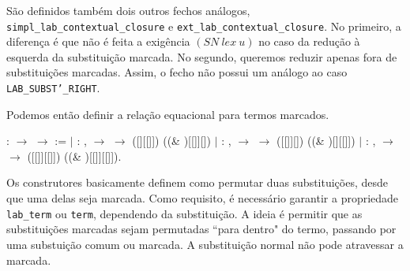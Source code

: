 \bigskip

São definidos também dois outros fechos análogos,
\texttt{simpl\_lab\_contextual\_closure} e
\texttt{ext\_lab\_contextual\_closure}. No primeiro, a diferença é que não é
feita a exigência $(SN\ lex\ u)$ no caso da redução à esquerda da
substituição marcada. No segundo, queremos reduzir apenas fora de substituições
marcadas. Assim, o fecho não possui um análogo ao caso
\texttt{LAB\_SUBST'\_RIGHT}.

\smallskip

Podemos então definir a relação equacional para termos marcados.

\coqdocnoindent {}   : 
\ensuremath{\rightarrow}  \ensuremath{\rightarrow}
 := \coqdoceol \coqdocnoindent 
\coqdocindent{1.00em}\ensuremath{|}  : \coqdockw{\ensuremath{\forall}}
  , \coqdoceol \coqdocindent{2.00em}
  \ensuremath{\rightarrow} 
 \ensuremath{\rightarrow} 
([][[]]) ((\&
)[[]][]) \coqdoceol \coqdocnoindent
\coqdocindent{1.00em}\ensuremath{|}  : \coqdockw{\ensuremath{\forall}}
  , \coqdoceol \coqdocindent{2.00em}
  \ensuremath{\rightarrow} 
 \ensuremath{\rightarrow} 
([[]][]) ((\&
)[][[]]) \coqdoceol \coqdocnoindent
\coqdocindent{1.00em}\ensuremath{|}  : \coqdockw{\ensuremath{\forall}}
  , \coqdoceol \coqdocindent{2.00em}
  \ensuremath{\rightarrow} 
 \ensuremath{\rightarrow} 
([[]][[]]) ((\&
)[[]][[]]).\coqdoceol

\bigskip

Os construtores basicamente definem como permutar duas substituições, desde que
uma delas seja marcada. Como requisito, é necessário garantir a propriedade
\texttt{lab\_term} ou \texttt{term}, dependendo da substituição. A ideia é
permitir que as substituições marcadas sejam permutadas ``para dentro" do termo,
passando por uma substuição comum ou marcada. A substituição normal não pode
atravessar a marcada.

